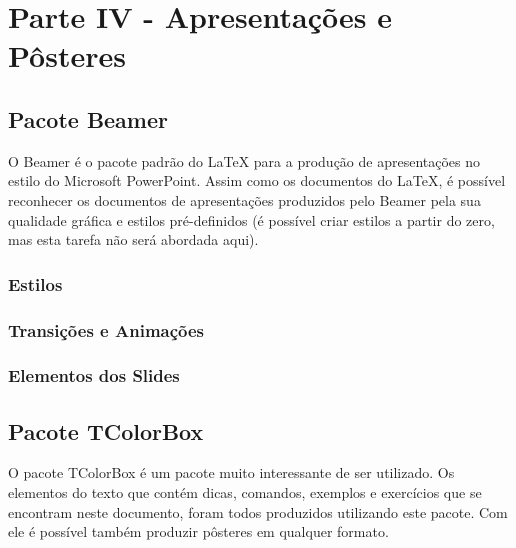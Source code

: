 \chapter{Parte IV - Apresentações e Pôsteres}
\label{cap:parteIV}

\section{Pacote Beamer}
\label{sec:beamer}

O Beamer é o pacote padrão do LaTeX para a produção de apresentações no estilo do Microsoft PowerPoint. Assim como os documentos do LaTeX, é possível reconhecer os documentos de apresentações produzidos pelo Beamer pela sua qualidade gráfica e estilos pré-definidos (é possível criar estilos a partir do zero, mas esta tarefa não será abordada aqui).

\subsection{Estilos}
\label{sec:estilos}

\subsection{Transições e Animações}
\label{sec:trans_anima}

\subsection{Elementos dos Slides}
\label{sec:elem_slides}

\section{Pacote TColorBox}
\label{sec:tcolorbox}

O pacote TColorBox é um pacote muito interessante de ser utilizado. Os elementos do texto que contém dicas, comandos, exemplos e exercícios que se encontram neste documento, foram todos produzidos utilizando este pacote. Com ele é possível também produzir pôsteres em qualquer formato.


